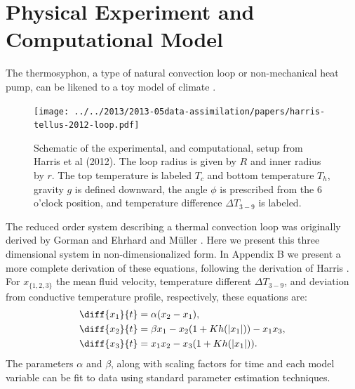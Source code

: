 \section{Physical Experiment and Computational Model}

The thermosyphon, a type of natural convection loop or non-mechanical heat pump, can be likened to a toy model of climate \cite{harris2011predicting}.
\begin{figure}[t!]
  \centering
  \texttt{[image: ../../2013/2013-05data-assimilation/papers/harris-tellus-2012-loop.pdf]}
  \caption[Schematic of the experimental, and computational, setup from Harris et al (2012)]{
    Schematic of the experimental, and computational, setup from Harris et al (2012).
    The loop radius is given by $R$ and inner radius by $r$.
    The top temperature is labeled $T_c$ and bottom temperature $T_h$, gravity $g$ is defined downward, the angle $\phi$ is prescribed from the 6 o'clock position, and temperature difference $\Delta T_{3-9}$ is labeled.
  }
  \label{fig:thermosyphons}
\end{figure}

The reduced order system describing a thermal convection loop was originally derived by Gorman \cite{gorman1986} and Ehrhard and M\"{u}ller \cite{ehrhard1990dynamical}.
Here we present this three dimensional system in non-dimensionalized form.
In Appendix B we present a more complete derivation of these equations, following the derivation of Harris \cite{harris2011predicting}.
For $x_{\{1,2,3\}}$ the mean fluid velocity, temperature different $\Delta T_{3-9}$, and deviation from conductive temperature profile, respectively, these equations are:
\begin{align}
& \diff{x_1}{t} = \alpha (x_2 - x_1),\\
& \diff{x_2}{t} = \beta x_1 - x_2 (1 + Kh(|x_1|)) - x_1x_3,\\
& \diff{x_3}{t} = x_1x_2 - x_3 (1 + Kh(|x_1|)) .\end{align}
The parameters $\alpha$ and $\beta$, along with scaling factors for time and each model variable can be fit to data using standard parameter estimation techniques.


